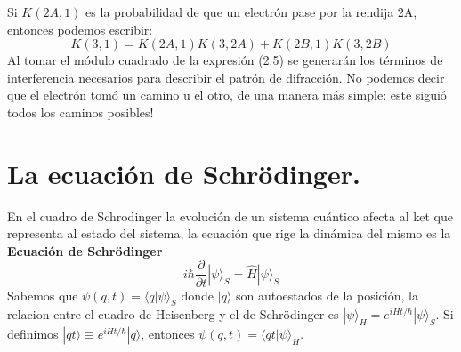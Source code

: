 Si $K(2A,1)$ es la probabilidad de que un electrón pase por la rendija 2A, entonces podemos escribir:
\begin{equation}
K(3,1)=K(2A,1)K(3,2A)+K(2B,1)K(3,2B)
\end{equation}
Al tomar el módulo cuadrado de la expresión (2.5) se generarán los términos de interferencia necesarios para describir el patrón de difracción. No podemos decir que el electrón tomó un camino u el otro, de una manera más simple: este siguió todos los caminos posibles!

\section{La ecuación de Schrödinger.}
En el cuadro de Schrodinger la evolución de un sistema cuántico afecta al ket que representa al estado del sistema, la ecuación que rige la dinámica del mismo es la \textbf{Ecuación de Schrödinger}
\begin{equation}
i\hbar\frac{\partial}{\partial t}|\psi\rangle_S=\hat{H}|\psi\rangle_S
\end{equation}
Sabemos que $\psi(q,t)=\langle q|\psi \rangle_S$ donde $|q\rangle$ son autoestados de la posición, la relacion entre el cuadro de Heisenberg y el de Schrödinger es $|\psi\rangle_H=e^{iHt/\hbar}|\psi\rangle_S$. Si definimos $|qt\rangle \equiv e^{iHt/\hbar}|q\rangle$, entonces $\psi (q,t)=\langle qt|\psi\rangle_H$.

